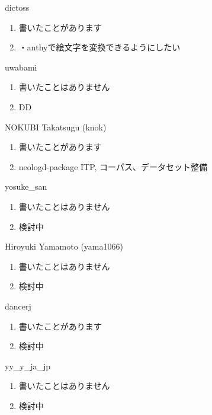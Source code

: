 \begin{prework}{ dictoss }
  \begin{enumerate}
  \item 書いたことがあります
  \item ・anthyで絵文字を変換できるようにしたい
  \end{enumerate}
\end{prework}

\begin{prework}{ uwabami }
  \begin{enumerate}
  \item 書いたことはありません
  \item DD
  \end{enumerate}
\end{prework}

\begin{prework}{ NOKUBI Takatsugu (knok) }
  \begin{enumerate}
  \item 書いたことがあります
  \item neologd-package ITP, コーパス、データセット整備
  \end{enumerate}
\end{prework}

\begin{prework}{ yosuke\_san }
  \begin{enumerate}
  \item 書いたことはありません
  \item 検討中
  \end{enumerate}
\end{prework}

\begin{prework}{ Hiroyuki Yamamoto (yama1066) }
  \begin{enumerate}
  \item 書いたことはありません
  \item 検討中
  \end{enumerate}
\end{prework}

\begin{prework}{ dancerj }
  \begin{enumerate}
  \item 書いたことがあります
  \item 検討中
  \end{enumerate}
\end{prework}

\begin{prework}{ yy\_y\_ja\_jp }
  \begin{enumerate}
  \item 書いたことはありません
  \item 検討中
  \end{enumerate}
\end{prework}


